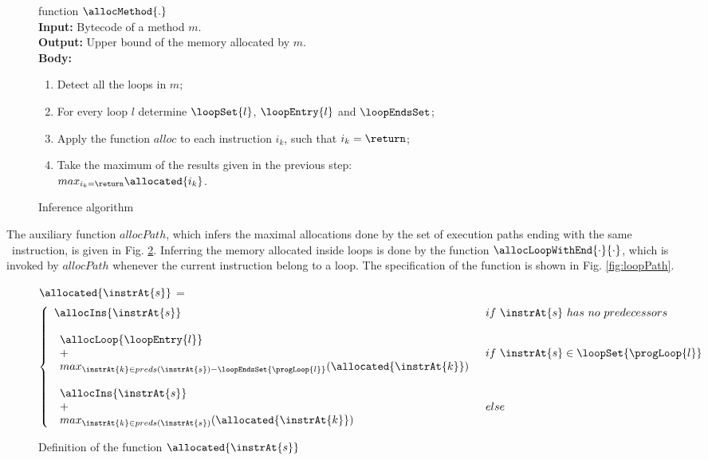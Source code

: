 \begin{figure}[!htp]
function $\allocMethod{.}$\\
\textbf{Input:} Bytecode of a method $m$. \\
\textbf{Output:} Upper bound of the memory allocated by $m$. \\
\textbf{Body:}
\begin{enumerate}
   \item Detect all the loops in $m$;
   \item For every loop $l$ determine $\loopSet{l}$, $\loopEntry{l}$ and $\loopEndsSet$;
   \item Apply the function $alloc$ to each instruction $i_k$, such that $i_k = \return$;
   \item Take the maximum of the results given in the previous step: \\
 $max_{i_k = \return } \allocated{i_k}$.
\end{enumerate}
\caption{\sc Inference algorithm}
\label{methodAlloc}
\end{figure}

The auxiliary function $allocPath$, which infers the maximal allocations done by the set of execution paths ending with the same \return\ instruction, is given in Fig. \ref{fig:allocMethod}.
Inferring the memory allocated inside loops is done by the function $\allocLoopWithEnd{\cdot}{\cdot}$, which is invoked by $allocPath$ whenever the current instruction belong to a loop. The specification of the function is shown in Fig. \ref{fig:loopPath}.

\begin{figure}[!hbp]
$\allocated{\instrAt{s}}$ = 
$$ \left\{ \begin{array}{ll}
\allocIns{\instrAt{s} }   &  if \ \instrAt{s} \ has \ no \ predecessors \\
& \\
  \begin{array}{l}
            \allocLoop{\loopEntry{l}} \\
             + \\
            max_{\instrAt{k} \in preds(\instrAt{s} )-\loopEndsSet{\progLoop{l}}}( \allocated{\instrAt{k}} ) \\
                   \end{array}      & if \  \instrAt{s} \in \loopSet{\progLoop{l}} \\
& \\
\begin{array}{l}
\allocIns{\instrAt{s}} \\
 + \\
max_{\instrAt{k} \in preds(\instrAt{s} )}
 ( \allocated{\instrAt{k}} )
                       \end{array} & else 
\end{array}
\right.
$$
\caption{\sc Definition of the function $\allocated{\instrAt{s}}$} 
\label{fig:allocMethod}
\end{figure}


